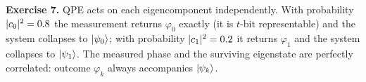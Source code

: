 \begin{solution}
\textbf{Exercise 7.} QPE acts on each eigencomponent independently. With
probability $\lvert c_0\rvert^2=0.8$ the measurement returns $\varphi_0$ exactly (it is
$t$-bit representable) and the system collapses to $\ket{\psi_0}$; with
probability $\lvert c_1\rvert^2=0.2$ it returns $\varphi_1$ and the system collapses to
$\ket{\psi_1}$. The measured phase and the surviving eigenstate are perfectly
correlated: outcome $\varphi_k$ always accompanies $\ket{\psi_k}$.
\end{solution}
